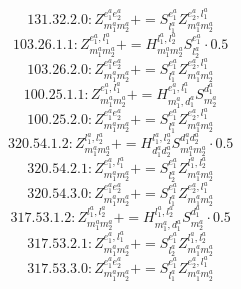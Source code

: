 \documentclass[letterpaper,10pt,fleqn,leqno,onecolumn]{article}
\begin{document}
\begin{equation} \;\;\;\;\;\;  131.32.2.0: Z^{e_{1}^{a}e_{2}^{a}}_{m_{1}^{a}m_{2}^{a}}+=S^{e_{1}^{a}}_{l_{1}^{a}}Z^{e_{2}^{a},l_{1}^{a}}_{m_{1}^{a}m_{2}^{a}} \end{equation}
\begin{equation} \;\;\;\;\;\;  103.26.1.1: Z^{e_{1}^{a},l_{1}^{a}}_{m_{1}^{a}m_{2}^{a}}+=H^{l_{1}^{a},l_{2}^{a}}_{m_{1}^{a}m_{2}^{a}}S^{e_{1}^{a}}_{l_{2}^{a}}\cdot 0.5 \end{equation}
\begin{equation} \;\;\;\;\;\;  103.26.2.0: Z^{e_{1}^{a}e_{2}^{a}}_{m_{1}^{a}m_{2}^{a}}+=S^{e_{1}^{a}}_{l_{1}^{a}}Z^{e_{2}^{a},l_{1}^{a}}_{m_{1}^{a}m_{2}^{a}} \end{equation}
\begin{equation} \;\;\;\;\;\;  100.25.1.1: Z^{e_{1}^{a},l_{1}^{a}}_{m_{1}^{a}m_{2}^{a}}+=H^{e_{1}^{a},l_{1}^{a}}_{m_{1}^{a},d_{1}^{a}}S^{d_{1}^{a}}_{m_{2}^{a}} \end{equation}
\begin{equation} \;\;\;\;\;\;  100.25.2.0: Z^{e_{1}^{a}e_{2}^{a}}_{m_{1}^{a}m_{2}^{a}}+=S^{e_{1}^{a}}_{l_{1}^{a}}Z^{e_{2}^{a},l_{1}^{a}}_{m_{1}^{a}m_{2}^{a}} \end{equation}
\begin{equation} \;\;\;\;\;\;  320.54.1.2: Z^{l_{1}^{a},l_{2}^{a}}_{m_{1}^{a}m_{2}^{a}}+=H^{l_{1}^{a},l_{2}^{a}}_{d_{1}^{a}d_{2}^{a}}S^{d_{1}^{a}d_{2}^{a}}_{m_{1}^{a}m_{2}^{a}}\cdot 0.5 \end{equation}
\begin{equation} \;\;\;\;\;\;  320.54.2.1: Z^{e_{1}^{a},l_{1}^{a}}_{m_{1}^{a}m_{2}^{a}}+=S^{e_{1}^{a}}_{l_{2}^{a}}Z^{l_{1}^{a},l_{2}^{a}}_{m_{1}^{a}m_{2}^{a}} \end{equation}
\begin{equation} \;\;\;\;\;\;  320.54.3.0: Z^{e_{1}^{a}e_{2}^{a}}_{m_{1}^{a}m_{2}^{a}}+=S^{e_{1}^{a}}_{l_{1}^{a}}Z^{e_{2}^{a},l_{1}^{a}}_{m_{1}^{a}m_{2}^{a}} \end{equation}
\begin{equation} \;\;\;\;\;\;  317.53.1.2: Z^{l_{1}^{a},l_{2}^{a}}_{m_{1}^{a}m_{2}^{a}}+=H^{l_{1}^{a},l_{2}^{a}}_{m_{1}^{a},d_{1}^{a}}S^{d_{1}^{a}}_{m_{2}^{a}}\cdot 0.5 \end{equation}
\begin{equation} \;\;\;\;\;\;  317.53.2.1: Z^{e_{1}^{a},l_{1}^{a}}_{m_{1}^{a}m_{2}^{a}}+=S^{e_{1}^{a}}_{l_{2}^{a}}Z^{l_{1}^{a},l_{2}^{a}}_{m_{1}^{a}m_{2}^{a}} \end{equation}
\begin{equation} \;\;\;\;\;\;  317.53.3.0: Z^{e_{1}^{a}e_{2}^{a}}_{m_{1}^{a}m_{2}^{a}}+=S^{e_{1}^{a}}_{l_{1}^{a}}Z^{e_{2}^{a},l_{1}^{a}}_{m_{1}^{a}m_{2}^{a}} \end{equation}
\end{document}
